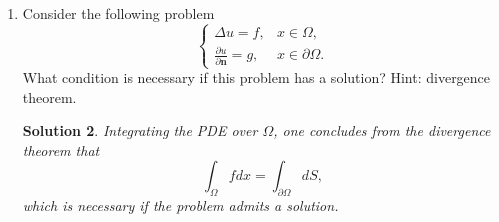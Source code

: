 \documentclass[6pt]{article}
\newtheorem{solution}{Solution}
\numberwithin{equation}{section}
\begin{document}
\begin{enumerate}
\begin{solution}
\begin{equation*}
\left\{
\begin{array}{ll}
r^2A_{1}^{''}+rA_{1}^{'}-A_1=1~~~~~~(4)   \\
A_1(1)=A_1(2)=0  \\
\end{array}
\right.
\end{equation*}
Denote $r=e^x$, then we have
\[\frac{d^2 A_1}{d r^2}-A_1=e^{2x}\]
Firstly, let us solve the equation
\[\frac{d^2 A_1}{d r^2}-A_1=0\]
we can get the general solution of $A_1(r)$ is $m_1e^x+m_2e^{-x}$ and moreover we can get the special solution of $A_1(r)$ is $A_{1}^{*}(r)=be^{2x}=br^2$.  Then substitute $A_{1}^{*}(r)$ into the equation $(4)$, we have $3b=1$, i.e, $b=\frac{1}{3}$.  Finally, we can get the common solution of $A_1(r)$ is
\[A_1(r)=m_1r+m_2\frac{1}{r}+\frac{1}{3}r^2\]
since $A_1(1)=A_1(2)=0$, i.e,
\begin{equation*} \label{1}
\left\{
\begin{array}{ll}
m_1+m_2+\frac{1}{3}=0  \\
2m_1+\frac{1}{2}m_2+\frac{4}{3}=0 \\
\end{array}
\right.
\end{equation*}
Solving the system, we can get $m_1=-\frac{7}{9}$ and $m_2=\frac{4}{9}$. i.e,
\[A_1(r)=\frac{1}{3}r^2-\frac{7}{9}r+\frac{4}{9}\cdot\frac{1}{r}\]
Therefore, we can get
\begin{align*}
u(r,\theta)&=A_0(r)+\sum_{n=1}^{\infty}A_n(r)\cos n\theta+B_n(r)\sin n\theta\\
&=\frac{2}{\ln 2}\ln r+(\frac{1}{3}r^2-\frac{7}{9}r+\frac{4}{9}\cdot\frac{1}{r})\cos\theta
\end{align*}
\end{solution}


\item Consider the following problem
\begin{equation}
\left\{
\begin{array}{ll}
\Delta u=f,& x\in \Omega,\\
\frac{\partial u}{\partial \textbf{n}}=g,& x\in \partial \Omega.
\end{array}
\right.
\end{equation}
What condition is necessary if this problem has a solution?  Hint: divergence theorem.
\begin{solution}
Integrating the PDE over $\Omega$, one  concludes from the divergence theorem that
\[\int_\Omega fdx=\int_{\partial\Omega} dS,\]
which is necessary if the problem admits a solution.
\end{solution}



\end{enumerate}
\end{document}
